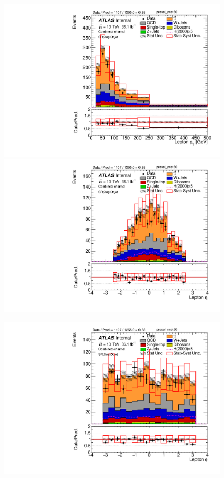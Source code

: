 \begin{figure}[!h]
\begin{center}
\includegraphics[scale=0.33]{./figures/boosted/PlotsInMbbSR/Unblinded/DataMC_2tag_0bjet_SR_lepton_presel_met50_LepPt}
\includegraphics[scale=0.33]{./figures/boosted/PlotsInMbbSR/Unblinded/DataMC_2tag_0bjet_SR_lepton_presel_met50_LepEta}\\
\par\medskip
\includegraphics[scale=0.33]{./figures/boosted/PlotsInMbbSR/Unblinded/DataMC_2tag_0bjet_SR_lepton_presel_met50_LepPhi}

\end{center}
\end{figure}
